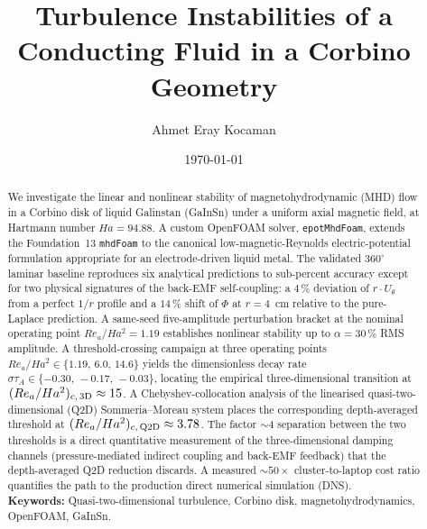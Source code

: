 \documentclass[aps,prl,twocolumn,superscriptaddress]{revtex4-2}
\begin{document}
\title{Turbulence Instabilities of a Conducting Fluid in a Corbino Geometry}

\author{Ahmet Eray Kocaman}

\date{\today}

\begin{abstract}
We investigate the linear and nonlinear stability of magnetohydrodynamic
(MHD) flow in a Corbino disk of liquid Galinstan (GaInSn) under a
uniform axial magnetic field, at Hartmann number $Ha = 94.88$.  A
custom OpenFOAM solver, \texttt{epotMhdFoam}, extends the
Foundation~13 \texttt{mhdFoam} to the canonical low-magnetic-Reynolds
electric-potential formulation appropriate for an electrode-driven
liquid metal.  The validated $360^{\circ}$ laminar baseline reproduces
six analytical predictions to sub-percent accuracy except for two
physical signatures of the back-EMF self-coupling: a $4\,\%$
deviation of $r\!\cdot\! U_\theta$ from a perfect $1/r$ profile and a
$14\,\%$ shift of $\Phi$ at $r = 4$~cm relative to the pure-Laplace
prediction.  A same-seed five-amplitude perturbation bracket at the
nominal operating point $Re_a/Ha^{2} = 1.19$ establishes nonlinear
stability up to $\alpha = 30\,\%$ RMS amplitude.  A
threshold-crossing campaign at three operating points
$Re_a/Ha^{2} \in \{1.19,\,6.0,\,14.6\}$ yields the dimensionless
decay rate $\sigma\tau_A \in \{-0.30,\,-0.17,\,-0.03\}$, locating
the empirical three-dimensional transition at
$(Re_a/Ha^{2})_{c,\,\rm 3D} \approx 15$.  A Chebyshev-collocation
analysis of the linearised quasi-two-dimensional (Q2D)
Sommeria--Moreau system places the corresponding depth-averaged
threshold at $(Re_a/Ha^{2})_{c,\,\rm Q2D} \approx 3.78$.  The factor
$\sim\!4$ separation between the two thresholds is a direct
quantitative measurement of the three-dimensional damping channels
(pressure-mediated indirect coupling and back-EMF feedback) that the
depth-averaged Q2D reduction discards.  A measured
$\sim\!50\!\times$ cluster-to-laptop cost ratio quantifies the path
to the production direct numerical simulation (DNS).
\\[1ex]
\textbf{Keywords:} Quasi-two-dimensional turbulence, Corbino disk,
magnetohydrodynamics, OpenFOAM, GaInSn.
\end{abstract}

\maketitle
\end{document}
